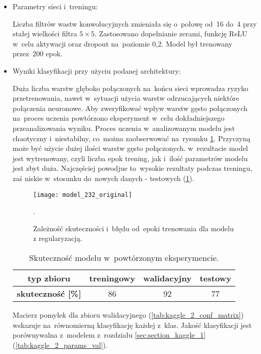 {\begin{itemize}
\item Parametry sieci i~treningu:

Liczba filtrów wastw konwolucyjnych zmieniała się o~połowę od~16 do~4 przy stałej wielkości filtra $5\times5$. Zastosowano dopełnianie zerami, funkcję ReLU w~celu aktywacji oraz dropout na~poziomie 0,2. Model był trenowany przez~200 epok.

\item Wyniki klasyfikacji przy użyciu podanej architektury:

Duża liczba warstw głęboko połączonych na~końcu sieci wprowadza ryzyko przetrenowania, nawet w~sytuacji użycia warstw odrzucających niektóre połączenia neuronowe. Aby zweryfikować wpływ warstw gęsto połączonych na~proces uczenia powtórzono eksperyment w~celu dokładniejszego przeanalizowania wyniku. Proces uczenia w~analizowanym modelu jest chaotyczny i~niestabilny, co~można zaobserwować na~rysunku \ref{fig:kaggle_2_acc_trening}. Przyczyną może być użycie dużej ilości warstw gęsto połączonych. w~rezultacie model jest wytrenowany, czyli liczba epok trening, jak i~ilość parametrów modelu jest zbyt duża. Najczęściej powodjue to~wysokie rezultaty podczas treningu, zaś niskie w~stosunku do~nowych danych - testowych (\ref{tab:kaggle_2_acc_2}).

\begin{figure}[h!]
	\centering
	\centering
		\texttt{[image: model\_232\_original]}
	\caption{Zależność skuteczności i~błędu od~epoki trenowania dla modelu z regularyzacją.}.
	\label{fig:kaggle_2_acc_trening}
\end{figure}

\begin{table}[h!]
\centering
\caption[Short Heading]{Skuteczność modelu w~powtórzonym eksperymencie.}
\label{tab:kaggle_2_acc_2}
\begin{tabular}{|c|c|c|c|}
\hline
\textbf{typ zbioru}           & \textbf{treningowy} & \textbf{walidacyjny} & \textbf{testowy} \\ \hline
\textbf{skuteczność {[}\%{]}} & 86                  & 92                   & 77               \\ \hline
\end{tabular}
\end{table}

Macierz pomyłek dla zbioru walidacyjnego (\ref{tab:kaggle_2_conf_matrix}) wskazuje na~równomierną klasyfikację każdej z~klas. Jakość klasyfikacji jest porównywalna z~modelem z~rozdziału \ref{sec:section_kaggle_1} (\ref{tab:kaggle_2_params_val}).


\end{itemize}}
